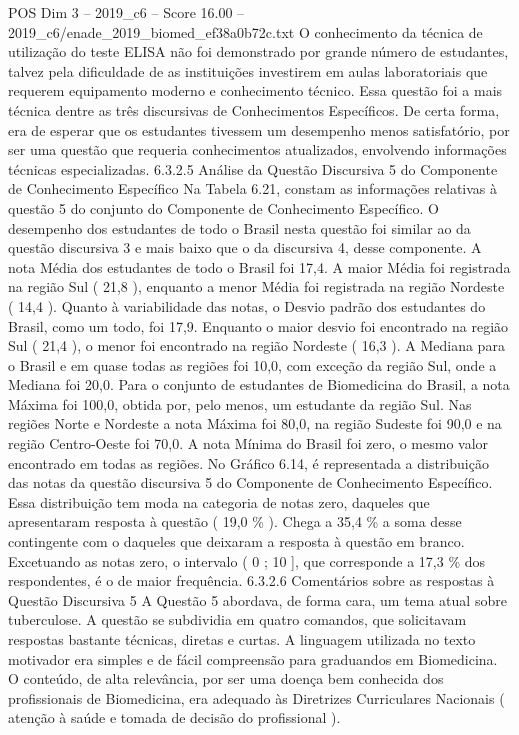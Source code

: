 \begin{textsample}{POS Dim 3 – 2019\_c6 – Score 16.00 – 2019\_c6/enade\_2019\_biomed\_ef38a0b72c.txt}
O conhecimento da técnica de utilização do teste ELISA não foi demonstrado por grande número de estudantes, talvez pela dificuldade de as instituições investirem em aulas laboratoriais que requerem equipamento moderno e conhecimento técnico.
Essa questão foi a mais técnica dentre as três discursivas de Conhecimentos Específicos.
De certa forma, era de esperar que os estudantes tivessem um desempenho menos satisfatório, por ser uma questão que requeria conhecimentos atualizados, envolvendo informações técnicas especializadas. 6.3.2.5 Análise da Questão Discursiva 5 do Componente de Conhecimento Específico Na Tabela 6.21, constam as informações relativas à questão 5 do conjunto do Componente de Conhecimento Específico.
O desempenho dos estudantes de todo o Brasil nesta questão foi similar ao da questão discursiva 3 e mais baixo que o da discursiva 4, desse componente.
A nota Média dos estudantes de todo o Brasil foi 17,4.
A maior Média foi registrada na região Sul ( 21,8 ), enquanto a menor Média foi registrada na região Nordeste ( 14,4 ).
Quanto à variabilidade das notas, o Desvio padrão dos estudantes do Brasil, como um todo, foi 17,9.
Enquanto o maior desvio foi encontrado na região Sul ( 21,4 ), o menor foi encontrado na região Nordeste ( 16,3 ).
A Mediana para o Brasil e em quase todas as regiões foi 10,0, com exceção da região Sul, onde a Mediana foi 20,0.
Para o conjunto de estudantes de Biomedicina do Brasil, a nota Máxima foi 100,0, obtida por, pelo menos, um estudante da região Sul.
Nas regiões Norte e Nordeste a nota Máxima foi 80,0, na região Sudeste foi 90,0 e na região Centro-Oeste foi 70,0.
A nota Mínima do Brasil foi zero, o mesmo valor encontrado em todas as regiões.
No Gráfico 6.14, é representada a distribuição das notas da questão discursiva 5 do Componente de Conhecimento Específico.
Essa distribuição tem moda na categoria de notas zero, daqueles que apresentaram resposta à questão ( 19,0 \% ).
Chega a 35,4 \% a soma desse contingente com o daqueles que deixaram a resposta à questão em branco.
Excetuando as notas zero, o intervalo ( 0 ; 10 ], que corresponde a 17,3 \% dos respondentes, é o de maior frequência. 6.3.2.6 Comentários sobre as respostas à Questão Discursiva 5 A Questão 5 abordava, de forma cara, um tema atual sobre tuberculose.
A questão se subdividia em quatro comandos, que solicitavam respostas bastante técnicas, diretas e curtas.
A linguagem utilizada no texto motivador era simples e de fácil compreensão para graduandos em Biomedicina.
O conteúdo, de alta relevância, por ser uma doença bem conhecida dos profissionais de Biomedicina, era adequado às Diretrizes Curriculares Nacionais ( atenção à saúde e tomada de decisão do profissional ).

\end{textsample}
